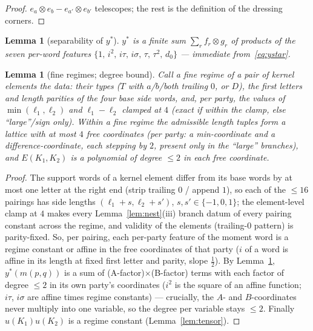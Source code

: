 \documentclass[11pt]{article}
\newtheorem{lemma}[theorem]{Lemma}
\begin{document}
\begin{proof}
$e_a\otimes e_b-e_{a'}\otimes e_{b'}$ telescopes; the rest is the
definition of the dressing corners.
\end{proof}

\begin{lemma}[separability of $y^\ast$]\label{lem:sep}
$y^\ast$ is a finite sum $\sum_r f_r\otimes g_r$ of products of the seven
per-word features $\{1,\,i^2,\,i\tau,\,i\sigma,\,\tau,\,\tau^2,\,d_0\}$ ---
immediate from~\eqref{eq:ystar}.
\end{lemma}

\begin{lemma}[fine regimes; degree bound]\label{lem:regime}
Call a \emph{fine regime} of a pair of kernel elements the data: their
types ($T$ with $a$/$b$/both trailing $0$, or $D$), the first letters and
length parities of the four base side words, and, per party, the values of
$\min(\ell_1,\ell_2)$ and $\ell_1-\ell_2$ clamped at $4$ (exact if within
the clamp, else ``large''/sign only). Within a fine regime the admissible
length tuples form a lattice with at most $4$ free coordinates (per party:
a min-coordinate and a difference-coordinate, each stepping by $2$,
present only in the ``large'' branches), and $E(K_1,K_2)$ is a polynomial
of degree $\le2$ in each free coordinate.
\end{lemma}

\begin{proof}
The support words of a kernel element differ from its base words by at most
one letter at the right end (strip trailing $0$ / append $1$), so each of
the $\le16$ pairings has side lengths $(\ell_1+s,\ell_2+s')$,
$s,s'\in\{-1,0,1\}$; the element-level clamp at $4$ makes every
Lemma~\ref{lem:nest}(iii) branch datum of every pairing constant across
the regime, and validity of the elements (trailing-$0$ pattern) is
parity-fixed. So, per pairing, each per-party feature of the moment word
is a regime constant or affine in the free coordinates of that party
($i$ of a word is affine in its length at fixed first letter and parity,
slope $\tfrac12$). By Lemma~\ref{lem:sep}, $y^\ast(m(p,q))$ is a sum of
(A-factor)$\times$(B-factor) terms with each factor of degree $\le2$ in
its own party's coordinates ($i^2$ is the square of an affine function;
$i\tau$, $i\sigma$ are affine times regime constants) --- crucially, the
$A$- and $B$-coordinates never multiply into one variable, so the degree
per variable stays $\le2$. Finally $u(K_1)u(K_2)$ is a regime constant
(Lemma~\ref{lem:tensor}).
\end{proof}
\end{document}
